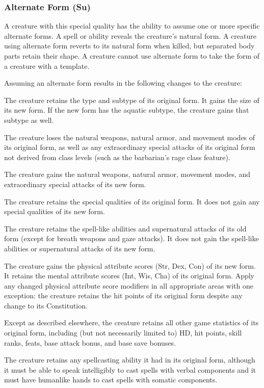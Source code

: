 \subsubsection{Alternate Form (Su)} A creature with this special quality has the ability to assume one or more specific alternate forms. A  spell or ability reveals the creature's natural form. A creature using alternate form reverts to its natural form when killed, but separated body parts retain their shape. A creature cannot use alternate form to take the form of a creature with a template. 

Assuming an alternate form results in the following changes to the creature:
\begin{itemize*}
\item The creature retains the type and subtype of its original form. It gains the size of its new form. If the new form has the aquatic subtype, the creature gains that subtype as well.
\item The creature loses the natural weapons, natural armor, and movement modes of its original form, as well as any extraordinary special attacks of its original form not derived from class levels (such as the barbarian's rage class feature). 
\item The creature gains the natural weapons, natural armor, movement modes, and extraordinary special attacks of its new form.
\item The creature retains the special qualities of its original form. It does not gain any special qualities of its new form.
\item The creature retains the spell-like abilities and supernatural attacks of its old form (except for breath weapons and gaze attacks). It does not gain the spell-like abilities or supernatural attacks of its new form.
\item The creature gains the physical attribute scores (Str, Dex, Con) of its new form. It retains the mental attribute scores (Int, Wis, Cha) of its original form. Apply any changed physical attribute score modifiers in all appropriate areas with one exception: the creature retains the hit points of its original form despite any change to its Constitution.
\item Except as described elsewhere, the creature retains all other game statistics of its original form, including (but not necessarily limited to) HD, hit points, skill ranks, feats, base attack bonus, and base save bonuses. 
\item The creature retains any spellcasting ability it had in its original form, although it must be able to speak intelligibly to cast spells with verbal components and it must have humanlike hands to cast spells with somatic components.

\end{itemize*}
